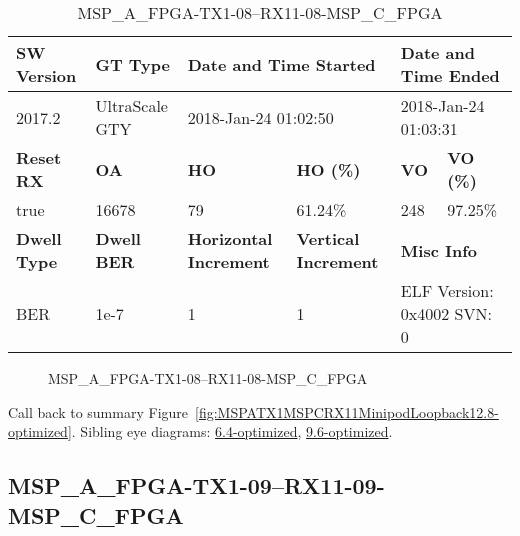 \begin{table}[h]
\centering
\caption{MSP\_A\_FPGA-TX1-08--RX11-08-MSP\_C\_FPGA}
\label{tab:MSPAFPGATX108RX1108MSPCFPGA12.8-optimized}
\begin{tabular}{@{}|l|l|l|l|l|l|@{}}
\toprule
\textbf{SW Version}                & \textbf{GT Type}   & \multicolumn{2}{l|}{\textbf{Date and Time Started}}            & \multicolumn{2}{l|}{\textbf{Date and Time Ended}}        \\ \midrule
2017.2                       & UltraScale GTY          & \multicolumn{2}{l|}{2018-Jan-24 01:02:50}                   & \multicolumn{2}{l|}{2018-Jan-24 01:03:31}               \\ \midrule
\textbf{Reset RX}                  & \textbf{OA} & \textbf{HO}   & \textbf{HO (\%)} & \textbf{VO} & \textbf{VO (\%)} \\ \midrule
true & 16678        & 79          & 61.24\%        & 248        & 97.25\%       \\ \midrule
\textbf{Dwell Type}                & \textbf{Dwell BER} & \textbf{Horizontal Increment} & \textbf{Vertical Increment}    & \multicolumn{2}{l|}{\textbf{Misc Info}}                  \\ \midrule
BER                            & 1e-7        & 1        & 1           & \multicolumn{2}{l|}{ELF Version: 0x4002 SVN: 0}                         \\ \bottomrule
\end{tabular}
\end{table}

\begin{figure}[h]
\caption{MSP\_A\_FPGA-TX1-08--RX11-08-MSP\_C\_FPGA} \label{fig:MSPAFPGATX108RX1108MSPCFPGA12.8-optimized}
\end{figure}

Call back to summary Figure~\ref{fig:MSPATX1MSPCRX11MinipodLoopback12.8-optimized}.
Sibling eye diagrams: \hyperref[sec:MSPAFPGATX108RX1108MSPCFPGA6.4-optimized]{6.4-optimized}, \hyperref[sec:MSPAFPGATX108RX1108MSPCFPGA9.6-optimized]{9.6-optimized}.

\clearpage
\newpage


\subsection{MSP\_A\_FPGA-TX1-09--RX11-09-MSP\_C\_FPGA}\label{sec:MSPAFPGATX109RX1109MSPCFPGA12.8-optimized}

